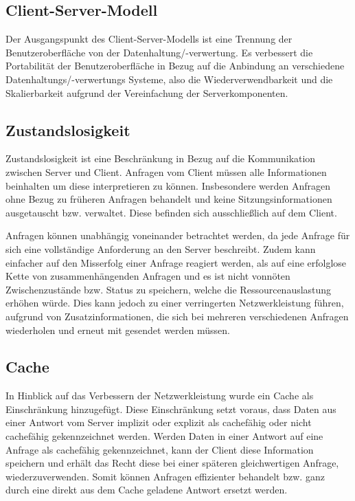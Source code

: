 \subsection{Client-Server-Modell}
Der Ausgangspunkt des Client-Server-Modells ist eine Trennung der Benutzeroberfläche von der Datenhaltung/-verwertung.
Es verbessert die Portabilität der Benutzeroberfläche in Bezug auf die Anbindung an verschiedene Datenhaltungs/-verwertungs Systeme,
also die Wiederverwendbarkeit und die Skalierbarkeit aufgrund der Vereinfachung der Serverkomponenten.

\subsection{Zustandslosigkeit}
Zustandslosigkeit ist eine Beschränkung in Bezug auf die Kommunikation zwischen Server und Client.
Anfragen vom Client müssen alle Informationen beinhalten um diese interpretieren zu können.
Insbesondere werden Anfragen ohne Bezug zu früheren Anfragen behandelt und keine Sitzungsinformationen ausgetauscht bzw. verwaltet.
Diese befinden sich ausschließlich auf dem Client. 

Anfragen können unabhängig voneinander betrachtet werden, da jede Anfrage für sich eine vollständige Anforderung an den Server beschreibt.
Zudem kann einfacher auf den Misserfolg einer Anfrage reagiert werden, als auf eine erfolglose Kette von zusammenhängenden Anfragen
und es ist nicht vonnöten Zwischenzustände bzw. Status zu speichern, welche die Ressourcenauslastung erhöhen würde.
Dies kann jedoch zu einer verringerten Netzwerkleistung führen, aufgrund von Zusatzinformationen, 
die sich bei mehreren verschiedenen Anfragen wiederholen und erneut mit gesendet werden müssen.

\subsection{Cache}
In Hinblick auf das Verbessern der Netzwerkleistung wurde ein Cache als Einschränkung hinzugefügt.
Diese Einschränkung setzt voraus, dass Daten aus einer Antwort vom Server implizit oder explizit als cachefähig oder nicht cachefähig gekennzeichnet werden.
Werden Daten in einer Antwort auf eine Anfrage als cachefähig gekennzeichnet, kann der Client diese Information speichern und erhält das Recht diese
bei einer späteren gleichwertigen Anfrage, wiederzuverwenden.
Somit können Anfragen effizienter behandelt bzw. ganz durch eine direkt aus dem Cache geladene Antwort ersetzt werden.

